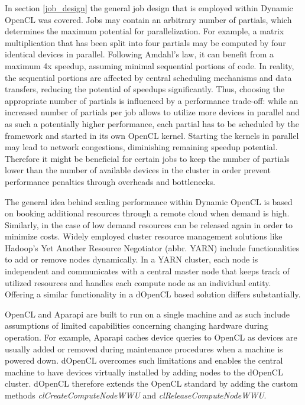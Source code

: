 In section \ref{job_design} the general job design that is employed within Dynamic OpenCL was covered. Jobs may contain an arbitrary number of partials, which determines the maximum potential for parallelization. For example, a matrix multiplication that has been split into four partials may be computed by four identical devices in parallel. Following Amdahl's law, it can benefit from a maximum 4x speedup\cite{amdahl}, assuming minimal sequential portions of code. In reality, the sequential portions are affected by central scheduling mechanisms and data transfers, reducing the potential of speedups significantly. Thus, choosing the appropriate number of partials is influenced by a performance trade-off: while an increased number of partials per job allows to utilize more devices in parallel and as such a potentially higher performance, each partial has to be scheduled by the framework and started in its own OpenCL kernel. Starting the kernels in parallel may lead to network congestions, diminishing remaining speedup potential. Therefore it might be beneficial for certain jobs to keep the number of partials lower than the number of available devices in the cluster in order prevent performance penalties through overheads and bottlenecks.

The general idea behind scaling performance within Dynamic OpenCL is based on booking additional resources through a remote cloud when demand is high. Similarly, in the case of low demand resources can be released again in order to minimize costs. Widely employed cluster resource management solutions like Hadoop's Yet Another Resource Negotiator (abbr. YARN) include functionalities to add or remove nodes dynamically. In a YARN cluster, each node is independent and communicates with a central master node that keeps track of utilized resources and handles each compute node as an individual entity. Offering a similar functionality in a dOpenCL based solution differs substantially.

OpenCL and Aparapi are built to run on a single machine and as such include assumptions of limited capabilities concerning changing hardware during operation. For example, Aparapi caches device queries to OpenCL as devices are usually added or removed during maintenance procedures when a machine is powered down. dOpenCL overcomes such limitations and enables the central machine to have devices virtually installed by adding nodes to the dOpenCL cluster. dOpenCL therefore extends the OpenCL standard by adding the custom methods \textit{clCreateComputeNodeWWU} and \textit{clReleaseComputeNodeWWU}.

